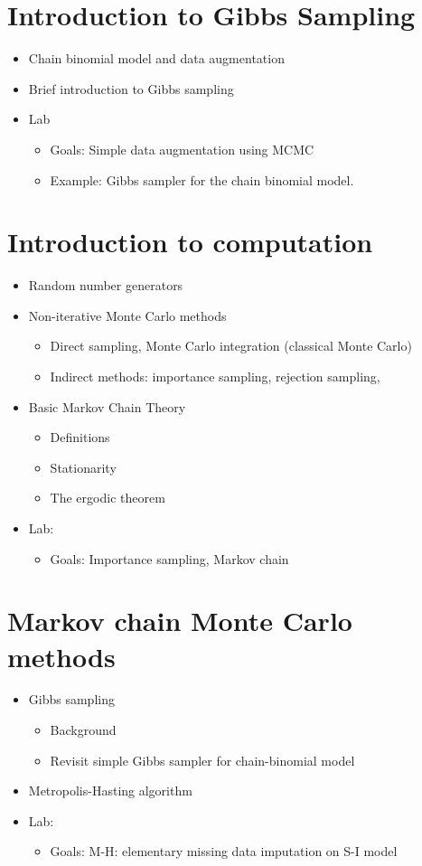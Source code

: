 \documentclass[11pt]{article}
\begin{document}
\section{Introduction to Gibbs Sampling}
\begin{itemize}
\item Chain binomial model and data augmentation
\item Brief introduction to Gibbs sampling
\item Lab
\begin{itemize}
\item Goals: Simple data augmentation using MCMC
\item Example: Gibbs sampler for the chain binomial model.
\end{itemize}
\end{itemize}


\section{Introduction to computation}
 \begin{itemize}
 \item Random number generators 
\item {Non-iterative Monte Carlo methods}
\begin{itemize}
\item Direct sampling, Monte Carlo integration (classical Monte Carlo)
\item Indirect methods: importance sampling, rejection sampling,
\end{itemize}
\item{Basic Markov Chain Theory} 
\begin{itemize}
\item Definitions
\item Stationarity
\item The ergodic theorem
\end{itemize}
\item Lab: 
\begin{itemize}
\item Goals: Importance sampling, Markov chain
\end{itemize} 
\end{itemize}

\section{Markov chain Monte Carlo methods}
\begin{itemize}
\item Gibbs sampling 
\begin{itemize}
\item Background 
\item Revisit simple Gibbs sampler for chain-binomial model 
\end{itemize}
\item{Metropolis-Hasting algorithm}
\item Lab: 
\begin{itemize}
\item Goals: M-H: elementary missing data imputation on S-I model
\end{itemize}
\end{itemize}
\end{document}
